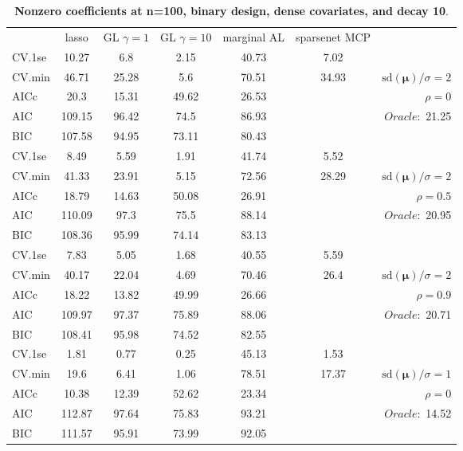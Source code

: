 \clearpage
\begin{table}\vspace{-.5cm}
\caption[l]{ { \bf Nonzero coefficients at n=100, binary design, 
dense covariates, and  decay  10}.}
\vspace{-.5cm}
\footnotesize{}
\begin{center}
\begin{tabular}{l*{5}{c}|r}
& lasso & GL $\gamma=1$ & GL $\gamma=10$ & marginal AL & sparsenet MCP  & \\
 \cline{1-7}
CV.1se & 10.27 & 6.8 & 2.15 & 40.73 & 7.02 & \\
CV.min & 46.71 & 25.28 & 5.6 & 70.51 & 34.93 &  $\mathrm{sd}(\mathbf{\mu})/\sigma=2$ \\
AICc & 20.3 & 15.31 & 49.62 & 26.53 & & $\rho=0$ \\
AIC & 109.15 & 96.42 & 74.5 & 86.93 & &  \multirow{2}{*}{$Oracle: $ 21.25} \\
BIC & 107.58 & 94.95 & 73.11 & 80.43 & &  \\
 \hline 
CV.1se & 8.49 & 5.59 & 1.91 & 41.74 & 5.52 & \\
CV.min & 41.33 & 23.91 & 5.15 & 72.56 & 28.29 &  $\mathrm{sd}(\mathbf{\mu})/\sigma=2$ \\
AICc & 18.79 & 14.63 & 50.08 & 26.91 & & $\rho=0.5$ \\
AIC & 110.09 & 97.3 & 75.5 & 88.14 & &  \multirow{2}{*}{$Oracle: $ 20.95} \\
BIC & 108.36 & 95.99 & 74.14 & 83.13 & &  \\
 \hline 
CV.1se & 7.83 & 5.05 & 1.68 & 40.55 & 5.59 & \\
CV.min & 40.17 & 22.04 & 4.69 & 70.46 & 26.4 &  $\mathrm{sd}(\mathbf{\mu})/\sigma=2$ \\
AICc & 18.22 & 13.82 & 49.99 & 26.66 & & $\rho=0.9$ \\
AIC & 109.97 & 97.37 & 75.89 & 88.06 & &  \multirow{2}{*}{$Oracle: $ 20.71} \\
BIC & 108.41 & 95.98 & 74.52 & 82.55 & &  \\
 \hline 
CV.1se & 1.81 & 0.77 & 0.25 & 45.13 & 1.53 & \\
CV.min & 19.6 & 6.41 & 1.06 & 78.51 & 17.37 &  $\mathrm{sd}(\mathbf{\mu})/\sigma=1$ \\
AICc & 10.38 & 12.39 & 52.62 & 23.34 & & $\rho=0$ \\
AIC & 112.87 & 97.64 & 75.83 & 93.21 & &  \multirow{2}{*}{$Oracle: $ 14.52} \\
BIC & 111.57 & 95.91 & 73.99 & 92.05 & &  \\

\end{tabular}
\end{center}
\end{table}
